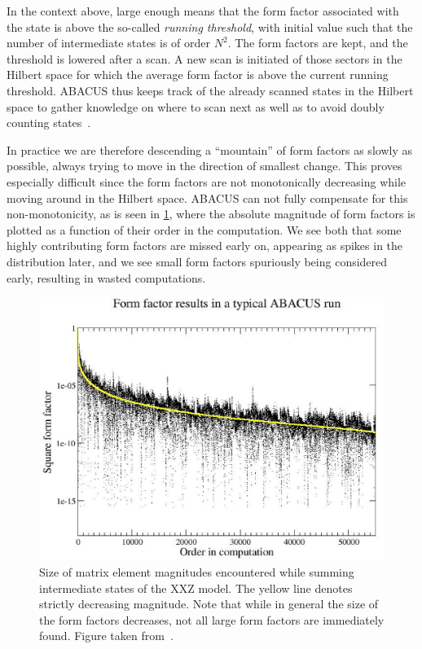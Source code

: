 \documentclass[11pt, a4paper]{report} %
\begin{document}
In the context above, large enough means that the form factor associated with the state is above the so-called \textit{running threshold}, with initial value such that the number of intermediate states is of order \(N^2\).
The form factors are kept, and the threshold is lowered after a scan. 
A new scan is initiated of those sectors in the Hilbert space for which the average form factor is above the current running threshold.
ABACUS thus keeps track of the already scanned states in the Hilbert space to gather knowledge on where to scan next as well as to avoid doubly counting states~\cite{Caux2009}.

In practice we are therefore descending a ``mountain'' of form factors as slowly as possible, always trying to move in the direction of smallest change.
This proves especially difficult since the form factors are not monotonically decreasing while moving around in the Hilbert space.
ABACUS can not fully compensate for this non-monotonicity, as is seen in \cref{fig:orderedmagnitudes}, where the absolute magnitude of form factors is plotted as a function of their order in the computation.
We see both that some highly contributing form factors are missed early on, appearing as spikes in the distribution later, and we see small form factors spuriously being considered early, resulting in wasted computations.
\begin{figure}[tb!]
  \centering
  \includegraphics[width=\textwidth]{FFsq_vs_order_D0p6N50M20_small}
  \caption{Size of matrix element magnitudes encountered while summing intermediate states of the XXZ model. The yellow line denotes strictly decreasing magnitude. Note that while in general the size of the form factors decreases, not all large form factors are immediately found. Figure taken from~\cite{Caux2009}.}
\label{fig:orderedmagnitudes}
\end{figure}
\end{document}

